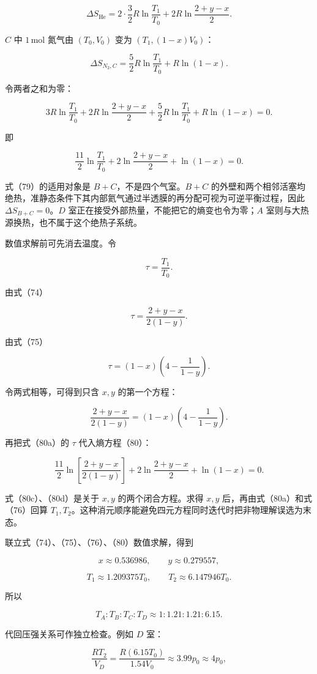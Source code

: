 \documentclass[12pt,a4paper,UTF8]{ctexart}
\begin{document}
\[\Delta S_{\mathrm{He}}
=2\cdot\frac32R\ln\frac{T_1}{T_0}
+2R\ln\frac{2+y-x}{2}. \tag{77}\]

\(C\) 中 \(1\,\mathrm{mol}\) 氮气由 \((T_0,V_0)\) 变为
\((T_1,(1-x)V_0)\)：

\[\Delta S_{N_2,C}
=\frac52R\ln\frac{T_1}{T_0}+R\ln(1-x). \tag{78}\]

令两者之和为零：

\[\boxed{
3R\ln\frac{T_1}{T_0}
+2R\ln\frac{2+y-x}{2}
+\frac52R\ln\frac{T_1}{T_0}
+R\ln(1-x)=0
}. \tag{79}\]

即

\[\frac{11}{2}\ln\frac{T_1}{T_0}
+2\ln\frac{2+y-x}{2}
+\ln(1-x)=0. \tag{80}\]

式（79）的适用对象是 \(B+C\)，不是四个气室。\(B+C\)
的外壁和两个相邻活塞均绝热，准静态条件下其内部氦气通过半透膜的再分配可视为可逆平衡过程，因此
\(\Delta S_{B+C}=0\)。\(D\)
室正在接受外部热量，不能把它的熵变也令为零；\(A\)
室则与大热源换热，也不属于这个绝热子系统。

数值求解前可先消去温度。令

\[\tau=\frac{T_1}{T_0}.\]

由式（74）

\[\tau=\frac{2+y-x}{2(1-y)}. \tag{80a}\]

由式（75）

\[\tau=(1-x)\left(4-\frac1{1-y}\right). \tag{80b}\]

令两式相等，可得到只含 \(x,y\) 的第一个方程：

\[\frac{2+y-x}{2(1-y)}
=(1-x)\left(4-\frac1{1-y}\right). \tag{80c}\]

再把式（80a）的 \(\tau\) 代入熵方程（80）：

\[\frac{11}{2}\ln\left[\frac{2+y-x}{2(1-y)}\right]
+2\ln\frac{2+y-x}{2}+\ln(1-x)=0. \tag{80d}\]

式（80c）、（80d）是关于 \(x,y\) 的两个闭合方程。求得 \(x,y\)
后，再由式（80a）和式（76）回算
\(T_1,T_2\)。这种消元顺序能避免四元方程同时迭代时把非物理解误选为末态。

联立式（74）、（75）、（76）、（80）数值求解，得到

\[x\approx0.536986,\qquad y\approx0.279557,\]

\[T_1\approx1.209375T_0,\qquad T_2\approx6.147946T_0. \tag{81}\]

所以

\[\boxed{T_A:T_B:T_C:T_D
\approx1:1.21:1.21:6.15}. \tag{82}\]

代回压强关系可作独立检查。例如 \(D\) 室：

\[\frac{RT_2}{V_D}
=\frac{R(6.15T_0)}{1.54V_0}
\approx3.99p_0\approx4p_0,\]
\end{document}
